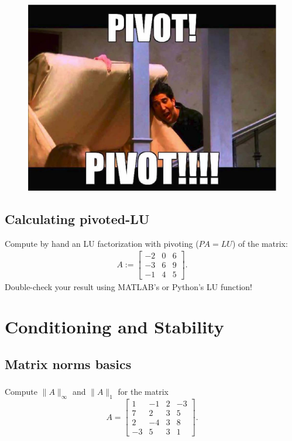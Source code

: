 \documentclass[11pt,letterpaper]{report}
\begin{document}
\begin{figure}[H]
    \centering
    \includegraphics[scale = 0.7]{Session_3/latex/figs/pivot_pivot}
\end{figure}



\section{Calculating pivoted-LU}
Compute by hand an LU factorization with pivoting ($PA = LU$) of the matrix:
\begin{align*}
A:=
  \begin{bmatrix}
    -2  &   0   &   6\\
    -3  &   6   &   9\\
    -1 &    4   &   5
  \end{bmatrix}.
\end{align*}
Double-check your result using MATLAB's or Python's LU function!
\chapter{Conditioning and Stability}
\section{Matrix norms basics}
\subsection{}
Compute $\|A\|_\infty$ and $\|A\|_1$ for the matrix
\[
A = \begin{bmatrix}
1 & -1  &2 & -3 \\ 7 & 2 & 3 & 5 \\ 2 & -4 & 3 & 8 \\ -3 & 5 & 3 & 1
\end{bmatrix}.
\]
\end{document}
